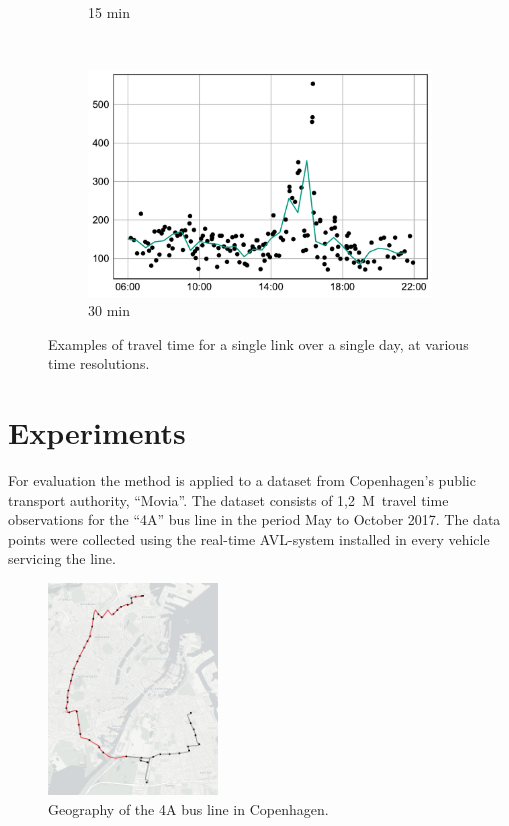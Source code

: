 \documentclass[preprint,11pt,5p,twocolumn]{elsarticle}
\begin{document}
\begin{figure}[!t]
\begin{subfigure}[t]{0.31\textwidth}
        \caption{15 min}
    \end{subfigure}
    ~
    \begin{subfigure}[t]{0.31\textwidth}
        \centering
        \includegraphics[width=\textwidth]{plots/decycle_30min_n.pdf}
        \caption{30 min}
    \end{subfigure}

    \caption{Examples of travel time for a single link over a single day, at various time resolutions.}
    \label{fig:resolutions}
\end{figure}
\newpage

\section{Experiments}
\label{sec:experiments}

For evaluation the method is applied to a dataset from Copenhagen's public transport authority, ``Movia''. The dataset consists of 1,2~M~travel time observations for the ``4A'' bus line in the period May to October 2017. The data points were collected using the real-time AVL-system installed in every vehicle servicing the line. 

\begin{figure}[!ht]
  \centering
  \includegraphics[width=0.4\textwidth]{drawings/map.png}
  \caption{Geography of the 4A bus line in Copenhagen.}
  \label{fig:4a_map}
\end{figure}
\end{document}
